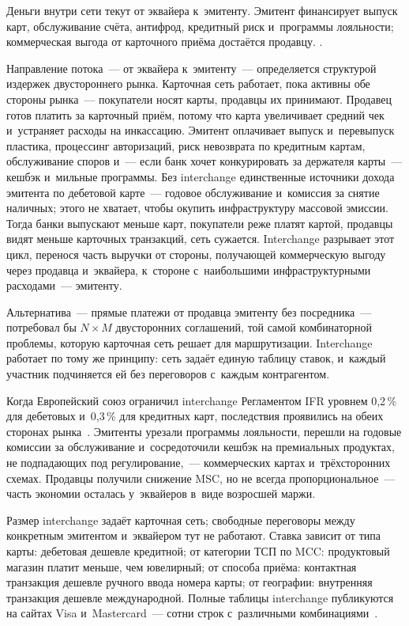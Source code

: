 Деньги внутри сети текут от эквайера к~эмитенту. Эмитент финансирует выпуск
карт, обслуживание счёта, антифрод, кредитный риск и~программы лояльности;
коммерческая выгода от карточного приёма достаётся продавцу. .

Направление потока~--- от эквайера к~эмитенту~--- определяется структурой
издержек двустороннего рынка. Карточная сеть работает, пока активны обе стороны
рынка~--- покупатели носят карты, продавцы их принимают. Продавец готов
платить за карточный приём, потому что карта увеличивает средний чек
и~устраняет расходы на инкассацию. Эмитент оплачивает выпуск
и~перевыпуск пластика, процессинг авторизаций, риск невозврата по кредитным
картам, обслуживание споров и~--- если банк хочет конкурировать за держателя
карты~--- кешбэк и~мильные программы. Без interchange единственные источники
дохода эмитента по дебетовой карте~--- годовое обслуживание и~комиссия за
снятие наличных; этого не хватает, чтобы окупить инфраструктуру массовой
эмиссии. Тогда банки выпускают меньше карт, покупатели реже платят картой, продавцы
видят меньше карточных транзакций, сеть сужается. Interchange разрывает этот
цикл, перенося часть выручки от стороны, получающей коммерческую выгоду через
продавца и~эквайера, к~стороне с~наибольшими инфраструктурными расходами~---
эмитенту.

Альтернатива~--- прямые платежи от продавца эмитенту без
посредника~--- потребовал бы $N \times M$ двусторонних соглашений, той самой
комбинаторной проблемы, которую карточная сеть решает для маршрутизации.
Interchange работает по тому же принципу: сеть задаёт единую таблицу ставок,
и~каждый участник подчиняется ей без переговоров с~каждым контрагентом.

Когда Европейский союз ограничил interchange Регламентом IFR уровнем 0,2\,\%
для дебетовых и~0,3\,\% для кредитных карт, последствия проявились на обеих
сторонах рынка~\cite{eu-ifr}. Эмитенты урезали программы лояльности, перешли на
годовые комиссии за обслуживание и~сосредоточили кешбэк на премиальных
продуктах, не подпадающих под регулирование,~--- коммерческих картах
и~трёхсторонних схемах. Продавцы получили снижение MSC, но не всегда
пропорциональное~--- часть экономии осталась у~эквайеров в~виде возросшей
маржи.

Размер interchange задаёт карточная сеть; свободные переговоры между конкретным
эмитентом и~эквайером тут не работают. Ставка зависит от типа карты: дебетовая
дешевле кредитной; от категории ТСП по MCC: продуктовый магазин платит меньше,
чем ювелирный; от способа приёма: контактная транзакция дешевле ручного ввода
номера карты; от географии: внутренняя транзакция дешевле международной. Полные
таблицы interchange публикуются на сайтах Visa
и~Mastercard~--- сотни строк с~различными
комбинациями~\cite{visa-interchange,mc-interchange-us}.

